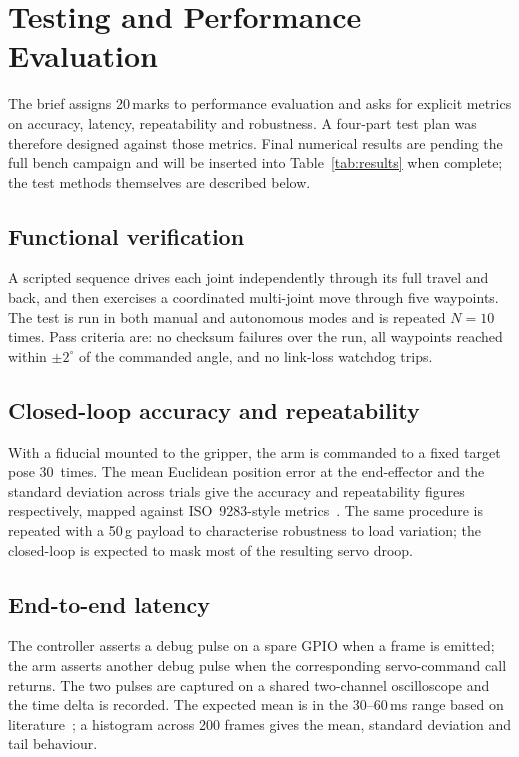 \section{Testing and Performance Evaluation}
\label{sec:testing}

The brief assigns 20\,marks to performance evaluation and asks for
explicit metrics on accuracy, latency, repeatability and robustness.
A four-part test plan was therefore designed against those metrics.
Final numerical results are pending the full bench campaign and will
be inserted into Table~\ref{tab:results} when complete; the test
methods themselves are described below.

\subsection{Functional verification}
A scripted sequence drives each joint independently through its full
travel and back, and then exercises a coordinated multi-joint move
through five waypoints. The test is run in both manual and
autonomous modes and is repeated $N=10$ times. Pass criteria are:
no checksum failures over the run, all waypoints reached within
$\pm 2^\circ$ of the commanded angle, and no link-loss watchdog
trips.

\subsection{Closed-loop accuracy and repeatability}
With a fiducial mounted to the gripper, the arm is commanded to a
fixed target pose 30~times. The mean Euclidean position error at the
end-effector and the standard deviation across trials give the
accuracy and repeatability figures respectively, mapped against
ISO~9283-style metrics~\cite{iso9283}. The same procedure is
repeated with a 50\,g payload to characterise robustness to load
variation; the closed-loop is expected to mask most of the resulting
servo droop.

\subsection{End-to-end latency}
The controller asserts a debug pulse on a spare GPIO when a frame is
emitted; the arm asserts another debug pulse when the corresponding
servo-command call returns. The two pulses are captured on a shared
two-channel oscilloscope and the time delta is recorded. The
expected mean is in the 30--60\,ms range based on
literature~\cite{gomez2012}; a histogram across 200 frames gives the
mean, standard deviation and tail behaviour.

